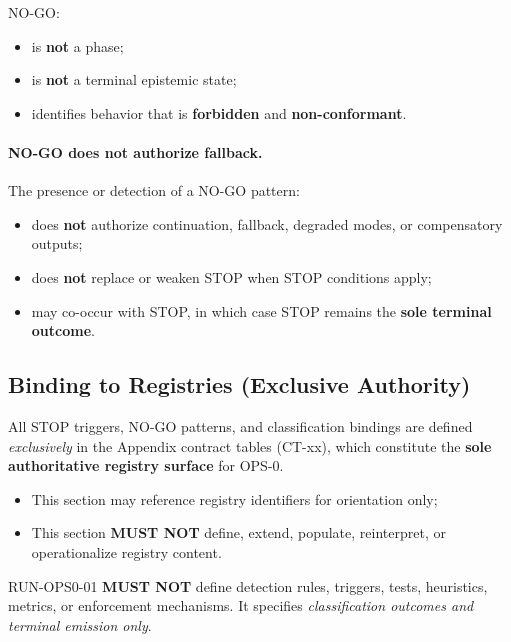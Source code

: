 NO-GO:
\begin{itemize}
  \item is \textbf{not} a phase;
  \item is \textbf{not} a terminal epistemic state;
  \item identifies behavior that is \textbf{forbidden} and \textbf{non-conformant}.
\end{itemize}

\paragraph{NO-GO does not authorize fallback.}
The presence or detection of a NO-GO pattern:
\begin{itemize}
  \item does \textbf{not} authorize continuation, fallback, degraded modes,
        or compensatory outputs;
  \item does \textbf{not} replace or weaken STOP when STOP conditions apply;
  \item may co-occur with STOP, in which case STOP remains the
        \textbf{sole terminal outcome}.
\end{itemize}

\subsection{Binding to Registries (Exclusive Authority)}
All STOP triggers, NO-GO patterns, and classification bindings are defined
\emph{exclusively} in the Appendix contract tables (CT-xx),
which constitute the \textbf{sole authoritative registry surface}
for OPS-0.

\begin{itemize}
  \item This section may reference registry identifiers for orientation only;
  \item This section \textbf{MUST NOT} define, extend, populate, reinterpret,
        or operationalize registry content.
\end{itemize}

RUN-OPS0-01 \textbf{MUST NOT} define detection rules, triggers,
tests, heuristics, metrics, or enforcement mechanisms.
It specifies \emph{classification outcomes and terminal emission only}.
